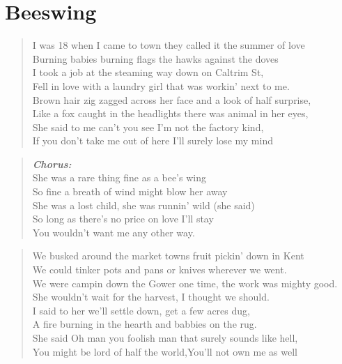 \documentclass[8pt,twoside]{extarticle}
\newenvironment{xverse}{
	\penalty 10000
	\begin{verse}
	\parskip 4pt
	}
	{
	\end{verse}
	\penalty 0
	}
\newenvironment{chorus}{\begin{xverse}\textbf{\emph{Chorus:}}\\}{\end{xverse}}
\begin{document}
\section{Beeswing}
\begin{xverse}
I was 18 when I came to town they called it the summer of love \\
Burning babies burning flags the hawks against the doves \\
I took a job at the steaming way down on Caltrim St, \\
Fell in love with a laundry girl that was workin’ next to me. \\
Brown hair zig zagged across her face and a look of half surprise, \\
Like a fox caught in the headlights there was animal in her eyes, \\
She said to me can’t you see I’m not the factory kind, \\
If you don’t take me out of here I’ll surely lose my mind \\
\end{xverse}

\begin{chorus}
She was a rare thing fine as a bee’s wing \\
So fine a breath of wind might blow her away \\
She was a lost child, she was runnin’ wild (she said) \\
So long as there’s no price on love I’ll stay \\
You wouldn’t want me any other way. \\
\end{chorus}

\begin{xverse}
We busked around the market towns fruit pickin’ down in Kent \\
We could tinker pots and pans or knives wherever we went. \\
We were campin down the Gower one time, the work was mighty good. \\
She wouldn’t wait for the harvest, I thought we should. \\
I said to her we’ll settle down, get a few acres dug, \\
A fire burning in the hearth and babbies on the rug. \\
She said Oh man you foolish man that surely sounds like hell, \\
You might be lord of half the world,You’ll not own me as well \\
\end{xverse}
\end{document}

